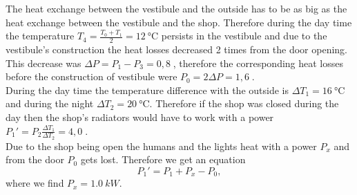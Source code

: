 {\ifEngSolution
The heat exchange between the vestibule and the outside has to be as big as the heat exchange between the vestibule and the shop. Therefore during the day time the temperature $T_4=\frac{T_0+T_1}{2}=\SI{12}{\celsius}$ persists in the vestibule and due to the vestibule’s construction the heat losses decreased 2 times from the door opening. This decrease was $\Delta P=P_1-P_3=0,8\;$, therefore the corresponding heat losses before the construction of vestibule were $P_0=2\Delta P=1,6\;$. \\
During the day time the temperature difference with the outside is $\Delta T_1=\SI{16}{\celsius}$ and during the night $\Delta T_2=\SI{20}{\celsius}$. Therefore if the shop was closed during the day then the shop’s radiators would have to work with a power $P_1'=P_2\frac{\Delta T_1}{\Delta T_2}=4,0\;$.\\
Due to the shop being open the humans and the lights heat with a power $P_x$ and from the door $P_0$ gets lost. Therefore we get an equation
\[
P_1'=P_1+P_x-P_0,
\]
where we find $P_x=\SI{1,0}{kW}$.
\fi
}